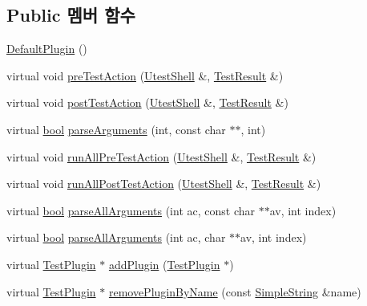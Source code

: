\subsection*{Public 멤버 함수}
\begin{DoxyCompactItemize}
\item 
\hyperlink{struct_default_plugin_a6441efd09b1b868de01b754a4e2e3e0f}{Default\+Plugin} ()
\item 
virtual void \hyperlink{class_test_plugin_aeb3d3b5a9cbcca6f8f4225bb29554ea2}{pre\+Test\+Action} (\hyperlink{class_utest_shell}{Utest\+Shell} \&, \hyperlink{class_test_result}{Test\+Result} \&)
\item 
virtual void \hyperlink{class_test_plugin_a4d9ea193c7b8e3eb8b50f985f688e4a8}{post\+Test\+Action} (\hyperlink{class_utest_shell}{Utest\+Shell} \&, \hyperlink{class_test_result}{Test\+Result} \&)
\item 
virtual \hyperlink{avb__gptp_8h_af6a258d8f3ee5206d682d799316314b1}{bool} \hyperlink{class_test_plugin_a167c2b07a0f83726bb9b1d1c0d741f88}{parse\+Arguments} (int, const char $\ast$$\ast$, int)
\item 
virtual void \hyperlink{class_test_plugin_aa3524b10b0f1613104fa75f1c1a72cf6}{run\+All\+Pre\+Test\+Action} (\hyperlink{class_utest_shell}{Utest\+Shell} \&, \hyperlink{class_test_result}{Test\+Result} \&)
\item 
virtual void \hyperlink{class_test_plugin_ac6e93f69beb5b43b8cedf17a77ccc6b1}{run\+All\+Post\+Test\+Action} (\hyperlink{class_utest_shell}{Utest\+Shell} \&, \hyperlink{class_test_result}{Test\+Result} \&)
\item 
virtual \hyperlink{avb__gptp_8h_af6a258d8f3ee5206d682d799316314b1}{bool} \hyperlink{class_test_plugin_acfa2bcea2c98a16cb7d2a8f177bb84b9}{parse\+All\+Arguments} (int ac, const char $\ast$$\ast$av, int index)
\item 
virtual \hyperlink{avb__gptp_8h_af6a258d8f3ee5206d682d799316314b1}{bool} \hyperlink{class_test_plugin_a6d3fb0408bb544bd7ec5ba9300328a5e}{parse\+All\+Arguments} (int ac, char $\ast$$\ast$av, int index)
\item 
virtual \hyperlink{class_test_plugin}{Test\+Plugin} $\ast$ \hyperlink{class_test_plugin_ac63612b566d31b52b9c09e0552f8fe9b}{add\+Plugin} (\hyperlink{class_test_plugin}{Test\+Plugin} $\ast$)
\item 
virtual \hyperlink{class_test_plugin}{Test\+Plugin} $\ast$ \hyperlink{class_test_plugin_a75abbb424eeb5b1466272ab22dd2cfcf}{remove\+Plugin\+By\+Name} (const \hyperlink{class_simple_string}{Simple\+String} \&name)
$$
\end{DoxyCompactItemize}
